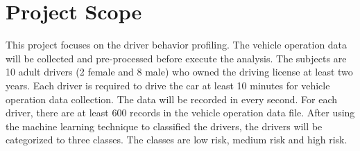 \section{Project Scope}
This project focuses on the driver behavior profiling. The vehicle operation data will be collected and pre-processed before execute the analysis. The subjects are 10 adult drivers (2 female and 8 male) who owned the driving license at least two years. Each driver is required to drive the car at least 10 minutes for vehicle operation data collection. The data will be recorded in every second. For each driver, there are at least 600 records in the vehicle operation data file. After using the machine learning technique to classified the drivers, the drivers will be categorized to three classes. The classes are low risk, medium risk and high risk. 
 